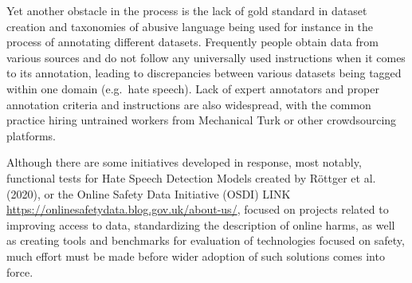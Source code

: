 \documentclass[
  10pt,
  dvipsnames,enabledeprecatedfontcommands]{scrartcl}
\begin{document}
Yet another obstacle in the process is the lack of gold standard in
dataset creation and taxonomies of abusive language being used for
instance in the process of annotating different datasets. Frequently
people obtain data from various sources and do not follow any
universally used instructions when it comes to its annotation, leading
to discrepancies between various datasets being tagged within one domain
(e.g.~hate speech). Lack of expert annotators and proper annotation
criteria and instructions are also widespread, with the common practice
hiring untrained workers from Mechanical Turk or other crowdsourcing
platforms.

Although there are some initiatives developed in response, most notably,
functional tests for Hate Speech Detection Models created by Röttger et
al. (2020), or the Online Safety Data Initiative (OSDI) LINK
\url{https://onlinesafetydata.blog.gov.uk/about-us/}, focused on
projects related to improving access to data, standardizing the
description of online harms, as well as creating tools and benchmarks
for evaluation of technologies focused on safety, much effort must be
made before wider adoption of such solutions comes into force.
\end{document}

